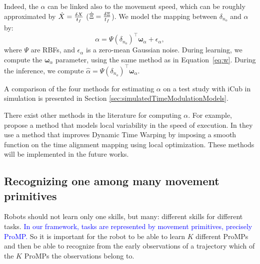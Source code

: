 \documentclass[utf8]{frontiersSCNS} %
\newcommand{\rev}[1]{\textcolor{blue}{#1}}
\begin{document}
Indeed, the $\alpha$ can be linked also to the movement speed, which can be roughly approximated by $\dot{X} ={ \delta X  \over t_f}$ ($\dot{\Xi} ={ \delta \Xi  \over t_f}$). We model the mapping between $\delta_{n_o}$ and $\alpha$ by: 
\begin{equation}
\label{eq:model}
\alpha = \Psi(\delta_{n_o})^\top \boldsymbol{\omega}_\alpha + \epsilon_\alpha,
\end{equation} 
where $\Psi$ are RBFs, and $\epsilon_\alpha$ is a zero-mean Gaussian noise.
During learning, we compute the  $\boldsymbol{\omega}_\alpha$ parameter, using the same method as in Equation~\ref{eq:w}.
During the inference, we compute $\hat{\alpha} = \Psi(\delta_{n_o})^\top \boldsymbol{\omega}_\alpha$.

A comparison of the four methods for estimating $\alpha$ on a test study with iCub in simulation is presented in Section \ref{sec:simulatedTimeModulationModels}.

There exist other methods in the literature for computing $\alpha$.  For example, \cite{ewerton2015learning} propose a method that models local variability in the speed of execution. In \cite{maeda2016probabilistic} they use a method that improves Dynamic Time Warping by imposing a smooth function on the time alignment mapping using local optimization. These methods will be implemented in the future works.


\subsection{Recognizing one among many movement primitives}
\label{sec:ManyProMP}
%
%
Robots should not learn only one skills, but many: different skills for different tasks. 
\rev{In our framework, tasks are represented by movement primitives, precisely ProMP.}
So it is important for the robot to be able to learn $K$ different ProMPs and then be able to recognize from the early observations of a trajectory which of the $K$ ProMPs the observations belong to.
\end{document}
